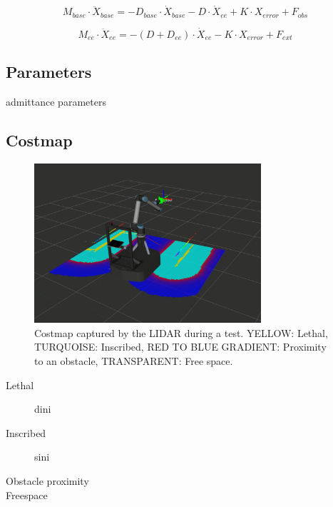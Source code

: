 \begin{equation}
M_{base} \cdot \ddot{X}_{base} = -D_{base} \cdot \dot{X}_{base} - D \cdot \dot{X}_{ee} + K \cdot X_{error}+F_{obs}
	\label{eq:adm_base}
\end{equation}

\begin{equation}
M_{ee} \cdot \ddot{X}_{ee} = -(D + D_{ee}) \cdot \dot{X}_{ee} - K \cdot X_{error}+F_{ext}
	\label{eq:adm_ee}
\end{equation}

\subsection{Parameters}
admittance parameters
\subsection{Costmap}
	\label{sec:costmap}
\begin{figure}
   \centering
   \includegraphics[width=0.75\textwidth]{images/costmap.png}
   \caption{Costmap captured by the LIDAR during a test. YELLOW: Lethal, TURQUOISE: Inscribed, RED TO BLUE GRADIENT: Proximity to an obstacle, TRANSPARENT: Free space. }
   \label{pics:costmap}
\end{figure}

\begin{description}
  \item[Lethal] dini 
  \item[Inscribed] sini
  \item[Obstacle proximity]
  \item[Freespace]
\end{description}

